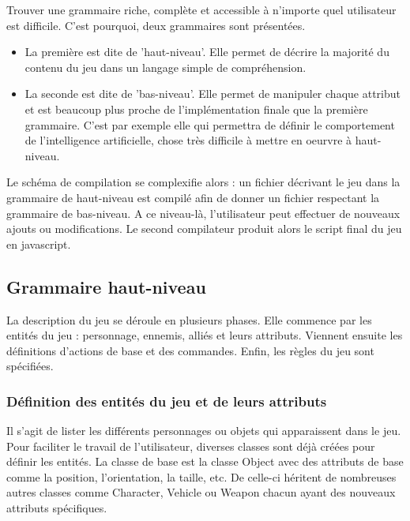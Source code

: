 

Trouver une grammaire riche, complète et accessible à n'importe quel utilisateur est difficile.
C'est pourquoi, deux grammaires sont présentées.

\begin{itemize}
 \item La première est dite de 'haut-niveau'.
Elle permet de décrire la majorité du contenu du jeu dans un langage simple de compréhension.
 \item La seconde est dite de 'bas-niveau'.
Elle permet de manipuler chaque attribut et est beaucoup plus proche de l'implémentation finale que la première grammaire.
C'est par exemple elle qui permettra de définir le comportement de l'intelligence artificielle, chose très difficile à mettre en oeurvre à haut-niveau.
\end{itemize}

Le schéma de compilation se complexifie alors : un fichier décrivant le jeu dans la grammaire de haut-niveau est compilé afin de donner un fichier
respectant la grammaire de bas-niveau. A ce niveau-là, l'utilisateur peut effectuer de nouveaux ajouts ou modifications. Le second compilateur
produit alors le script final du jeu en javascript.

\subsection{Grammaire haut-niveau}

La description du jeu se déroule en plusieurs phases.
Elle commence par les entités du jeu : personnage, ennemis, alliés et leurs attributs.
Viennent ensuite les définitions d'actions de base et des commandes.
Enfin, les règles du jeu sont spécifiées.

\subsubsection{Définition des entités du jeu et de leurs attributs}

Il s'agit de lister les différents personnages ou objets qui apparaissent dans le jeu.
Pour faciliter le travail de l'utilisateur, diverses classes sont déjà créées pour définir les entités.
La classe de base est la classe Object avec des attributs de base comme la position, l'orientation, la taille, etc.
De celle-ci héritent de nombreuses autres classes comme Character, Vehicle ou Weapon chacun ayant des nouveaux attributs spécifiques.

